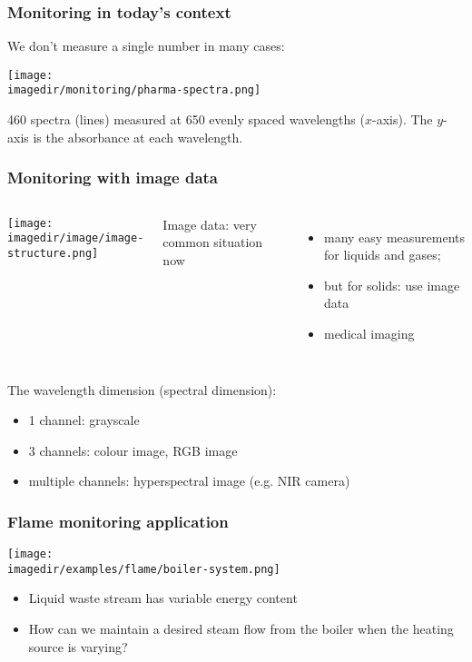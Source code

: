\begin{frame}\frametitle{Monitoring in today's context}

	We don't measure a single number in many cases:

	\texttt{[image: \\imagedir/monitoring/pharma-spectra.png]}

	460 spectra (lines) measured at 650 evenly spaced wavelengths ($x$-axis). The $y$-axis is the absorbance at each wavelength.

	\vspace{12pt}
	{\color{myOrange}{What can we monitor with this data?}}
\end{frame}

\begin{frame}\frametitle{Monitoring with image data}
	\begin{columns}[c]
			\begin{center}
				\texttt{[image: \\imagedir/image/image-structure.png]}
			\end{center}
			Image data: very common situation now
			\begin{itemize}
				\item	many easy measurements for liquids and gases;
				\item	but for solids: use image data
				\item	medical imaging
			\end{itemize}
	\end{columns}
	\vspace{12pt}
	The wavelength dimension (spectral dimension):
	\begin{itemize}
		\item	1 channel: grayscale
		\item	3 channels: colour image, RGB image
		\item	multiple channels: hyperspectral image (e.g. NIR camera)
	\end{itemize}
\end{frame}

\begin{frame}\frametitle{Flame monitoring application}
	\begin{center}
		\texttt{[image: \\imagedir/examples/flame/boiler-system.png]}
	\end{center}
	\begin{itemize}
		\item	Liquid waste stream has variable energy content
		\item	How can we maintain a desired steam flow from the boiler when the heating source is varying?
	\end{itemize}
\end{frame}


